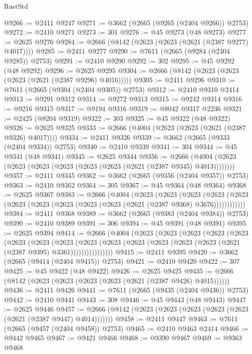\begin{lexlean}{RustStd}
\begin{coremodule}
@9266 := @2411 @9247
@9271 := @3662 (@2665 (@9265 (@2404 @9266)) @2753)
@9272 := @2410 @9271
@9273 := 301
@9276 := @45 @9273 (@48 @9273)
@9277 := @2625 @9276
@9284 := @2666 (@8142 (@2623 (@2623 (@2621 (@2387 @9277) @4017))))
@9285 := @2411 @9277
@9290 := @7611 (@2665 (@9284 (@2404 @9285)) @2753)
@9291 := @2410 @9290
@9292 := 302
@9295 := @45 @9292 (@48 @9292)
@9296 := @2625 @9295
@9304 := @2666 (@8142 (@2623 (@2623 (@2623 (@2621 (@2387 @9296) @4016)))))
@9305 := @2411 @9296
@9310 := @7611 (@2665 (@9304 (@2404 @9305)) @2753)
@9312 := @2410 @9310 @2414
@9313 := @9291 @9312
@9314 := @9272 @9313
@9315 := @9242 @9314
@9316 := @9216 @9315
@9317 := @9194 @9316
@9319 := @8042 @9317 @2236
@9321 := @2425 (@8204 @9319)
@9322 := 303
@9325 := @45 @9322 (@48 @9322)
@9326 := @2625 @9325
@9333 := @2666 (@4004 (@2623 (@2623 (@2621 (@2387 @9326) @4017))))
@9334 := @2411 @9326
@9339 := @3662 (@2665 (@9333 (@2404 @9334)) @2753)
@9340 := @2410 @9339
@9341 := 304
@9344 := @45 @9341 (@48 @9341)
@9345 := @2625 @9344
@9356 := @2666 (@4004 (@2623 (@2623 (@2623 (@2623 (@2623 (@2623 (@2621 (@2387 @9345) @4013))))))))
@9357 := @2411 @9345
@9362 := @3662 (@2665 (@9356 (@2404 @9357)) @2753)
@9363 := @2410 @9362
@9364 := 305
@9367 := @45 @9364 (@48 @9364)
@9368 := @2625 @9367
@9383 := @2666
    (@4004
      (@2623
        (@2623
          (@2623
            (@2623 (@2623 (@2623 (@2623 (@2623 (@2623 (@2623 (@2621 (@2387 @9368) @3676))))))))))))
@9384 := @2411 @9368
@9389 := @3662 (@2665 (@9383 (@2404 @9384)) @2753)
@9390 := @2410 @9389
@9391 := 306
@9394 := @45 @9391 (@48 @9391)
@9395 := @2625 @9394
@9414 := @2666
    (@4004
      (@2623
        (@2623
          (@2623
            (@2623
              (@2623
                (@2623
                  (@2623
                    (@2623
                      (@2623
                        (@2623
                          (@2623 (@2623 (@2623 (@2623 (@2621 (@2387 @9395) @3361))))))))))))))))
@9415 := @2411 @9395
@9420 := @3662 (@2665 (@9414 (@2404 @9415)) @2753)
@9421 := @2410 @9420
@9422 := 307
@9425 := @45 @9422 (@48 @9422)
@9426 := @2625 @9425
@9435 := @2666 (@8142 (@2623 (@2623 (@2623 (@2623 (@2621 (@2387 @9426) @4015))))))
@9436 := @2411 @9426
@9441 := @7611 (@2665 (@9435 (@2404 @9436)) @2753)
@9442 := @2410 @9441
@9443 := 308
@9446 := @45 @9443 (@48 @9443)
@9447 := @2625 @9446
@9457 := @2666 (@8142 (@2623 (@2623 (@2623 (@2623 (@2623 (@2621 (@2387 @9447) @4014)))))))
@9458 := @2411 @9447
@9463 := @7611 (@2665 (@9457 (@2404 @9458)) @2753)
@9465 := @2410 @9463 @2414
@9466 := @9442 @9465
@9467 := @9421 @9466
@9468 := @9390 @9467
@9469 := @9363 @9468

\end{coremodule}
\end{lexlean}
